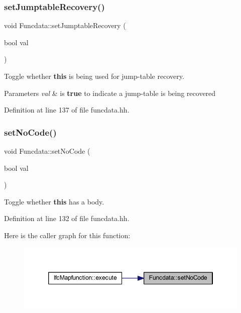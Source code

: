 \subsubsection{\texorpdfstring{setJumptableRecovery()}{setJumptableRecovery()}}
{\footnotesize\ttfamily void Funcdata\+::set\+Jumptable\+Recovery (\begin{DoxyParamCaption}\item[{bool}]{val }\end{DoxyParamCaption})\hspace{0.3cm}{\ttfamily [inline]}}



Toggle whether {\bfseries{this}} is being used for jump-\/table recovery. 


\begin{DoxyParams}{Parameters}
{\em val} & is {\bfseries{true}} to indicate a jump-\/table is being recovered \\
\hline
\end{DoxyParams}


Definition at line 137 of file funcdata.\+hh.

\mbox{\label{class_funcdata_aa9ac206ee7731d8f4db960f6daadc8b4}} 
\subsubsection{\texorpdfstring{setNoCode()}{setNoCode()}}
{\footnotesize\ttfamily void Funcdata\+::set\+No\+Code (\begin{DoxyParamCaption}\item[{bool}]{val }\end{DoxyParamCaption})\hspace{0.3cm}{\ttfamily [inline]}}



Toggle whether {\bfseries{this}} has a body. 



Definition at line 132 of file funcdata.\+hh.

Here is the caller graph for this function\+:
\nopagebreak
\begin{figure}[H]
\begin{center}
\leavevmode
\includegraphics[width=346pt]{class_funcdata_aa9ac206ee7731d8f4db960f6daadc8b4_icgraph}
\end{center}
\end{figure}
\mbox{\label{class_funcdata_af21c852eb9f606c5cd19fb2456927ecd}} 
